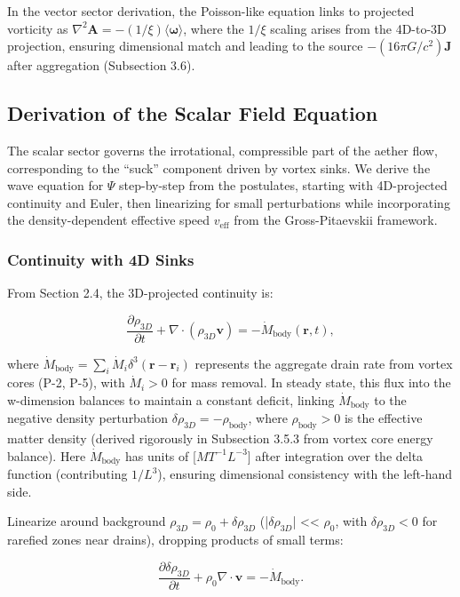 \documentclass{article}
\begin{document}
In the vector sector derivation, the Poisson-like equation links to projected vorticity as $\nabla^2 \mathbf{A} = - (1/\xi) \langle \boldsymbol{\omega} \rangle$, where the $1/\xi$ scaling arises from the 4D-to-3D projection, ensuring dimensional match and leading to the source $-(16\pi G / c^2) \mathbf{J}$ after aggregation (Subsection 3.6).

\subsection{Derivation of the Scalar Field Equation}

The scalar sector governs the irrotational, compressible part of the aether flow, corresponding to the ``suck'' component driven by vortex sinks. We derive the wave equation for $\Psi$ step-by-step from the postulates, starting with 4D-projected continuity and Euler, then linearizing for small perturbations while incorporating the density-dependent effective speed $v_{\text{eff}}$ from the Gross-Pitaevskii framework.

\subsubsection{Continuity with 4D Sinks}

From Section 2.4, the 3D-projected continuity is:

\[
\frac{\partial \rho_{3D}}{\partial t} + \nabla \cdot (\rho_{3D} \mathbf{v}) = -\dot{M}_{\text{body}}(\mathbf{r}, t),
\]

where $\dot{M}_{\text{body}} = \sum_i \dot{M}_i \delta^3(\mathbf{r} - \mathbf{r}_i)$ represents the aggregate drain rate from vortex cores (P-2, P-5), with $\dot{M}_i > 0$ for mass removal. In steady state, this flux into the w-dimension balances to maintain a constant deficit, linking $\dot{M}_{\text{body}}$ to the negative density perturbation $\delta \rho_{3D} = -\rho_{\text{body}}$, where $\rho_{\text{body}} > 0$ is the effective matter density (derived rigorously in Subsection 3.5.3 from vortex core energy balance). Here $\dot{M}_{\text{body}}$ has units of [$M T^{-1} L^{-3}$] after integration over the delta function (contributing $1/L^3$), ensuring dimensional consistency with the left-hand side.

Linearize around background $\rho_{3D} = \rho_0 + \delta \rho_{3D}$ (|$ \delta \rho_{3D} $| << $\rho_0$, with $\delta \rho_{3D} < 0$ for rarefied zones near drains), dropping products of small terms:

\[
\frac{\partial \delta \rho_{3D}}{\partial t} + \rho_0 \nabla \cdot \mathbf{v} = -\dot{M}_{\text{body}}.
\]
\end{document}
